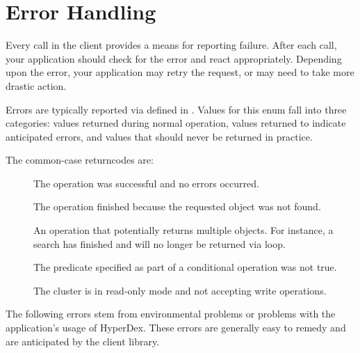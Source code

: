 \section{Error Handling}
\label{sec:api:c:client:error-handling}

Every call in the client provides a means for reporting failure.  After each
call, your application should check for the error and react appropriately.
Depending upon the error, your application may retry the request, or may need to
take more drastic action.

Errors are typically reported via 
defined in .  Values for this enum fall into three
categories:  values returned during normal operation, values returned to
indicate anticipated errors, and values that should never be returned in
practice.

The common-case returncodes are:

\begin{description}
\item[]  The operation was successful and no
    errors occurred.
\item[]  The operation finished because the
    requested object was not found.
\item[]  An operation that potentially
    returns multiple objects.  For instance, a search has
    finished and will no longer be returned via loop.
\item[]  The predicate specified as part of a
    conditional operation was not true.
\item[] The cluster is in read-only mode and
    not accepting write operations.
\end{description}

The following errors stem from environmental problems or problems with the
application's usage of HyperDex.  These errors are generally easy to remedy and
are anticipated by the client library.

